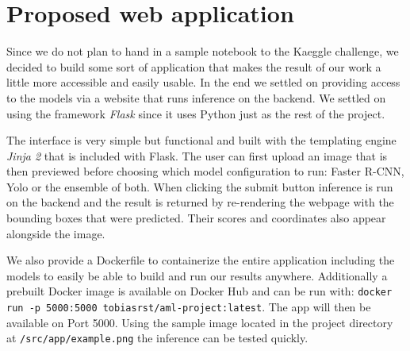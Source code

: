 \chapter{Proposed web application}\label{chapter:webapp}

Since we do not plan to hand in a sample notebook to the Kaeggle challenge, we decided to build some sort of application that makes the result of our work a little more accessible and easily usable. In the end we settled on providing access to the models via a website that runs inference on the backend. We settled on using the framework \textit{Flask} \autocite{ronacher_flask_nodate} since it uses Python just as the rest of the project.

The interface is very simple but functional and built with the templating engine \textit{Jinja 2} that is included with Flask. The user can first upload an image that is then previewed before choosing which model configuration to run: Faster R-CNN, Yolo or the ensemble of both. When clicking the submit button inference is run on the backend and the result is returned by re-rendering the webpage with the bounding boxes that were predicted. Their scores and coordinates also appear alongside the image. 

We also provide a Dockerfile to containerize the entire application including the models to easily be able to build and run our results anywhere. Additionally a prebuilt Docker image is available on Docker Hub and can be run with: \texttt{docker run -p 5000:5000 tobiasrst/aml-project:latest}. The app will then be available on Port 5000. Using the sample image located in the project directory at \texttt{/src/app/example.png} the inference can be tested quickly.